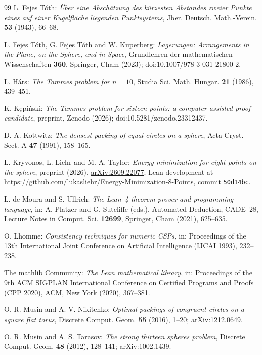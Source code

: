 \documentclass[12pt]{amsart}
\theoremstyle{definition}
\theoremstyle{plain}
\theoremstyle{definition}
\begin{document}
\begin{thebibliography}{99}
 L. Fejes T\'oth: \emph{\"Uber eine Absch\"atzung des k\"urzesten Abstandes zweier Punkte eines auf einer Kugelfl\"ache liegenden Punktsystems}, Jber. Deutsch. Math.-Verein. \textbf{53} (1943), 66--68. %

 L. Fejes T\'oth, G. Fejes T\'oth and W. Kuperberg: \emph{Lagerungen: Arrangements in the Plane, on the Sphere, and in Space}, Grundlehren der mathematischen Wissenschaften \textbf{360}, Springer, Cham (2023); doi:10.1007/978-3-031-21800-2. %

 L. H\'ars: \emph{The Tammes problem for $n=10$}, Studia Sci. Math. Hungar. \textbf{21} (1986), 439--451.

 K. K\k{e}pi\'nski: \emph{The Tammes problem for sixteen points: a computer-assisted proof candidate}, preprint, Zenodo (2026); doi:10.5281/zenodo.23312437.

 D. A. Kottwitz: \emph{The densest packing of equal circles on a sphere}, Acta Cryst. Sect. A \textbf{47} (1991), 158--165.

 L. Kryvonos, L. Liehr and M. A. Taylor: \emph{Energy minimization for eight points on the sphere}, preprint (2026), \href{https://arxiv.org/abs/2609.22077}{arXiv:2609.22077}; Lean development at \url{https://github.com/lukasliehr/Energy-Minimization-8-Points}, commit \texttt{50d14bc}.

 L. de Moura and S. Ullrich: \emph{The Lean~4 theorem prover and programming language}, in: A. Platzer and G. Sutcliffe (eds.), Automated Deduction, CADE~28, Lecture Notes in Comput. Sci. \textbf{12699}, Springer, Cham (2021), 625--635.

 O. Lhomme: \emph{Consistency techniques for numeric CSPs}, in: Proceedings of the 13th International Joint Conference on Artificial Intelligence (IJCAI 1993), 232--238.

 The mathlib Community: \emph{The Lean mathematical library}, in: Proceedings of the 9th ACM SIGPLAN International Conference on Certified Programs and Proofs (CPP 2020), ACM, New York (2020), 367--381.

 O. R. Musin and A. V. Nikitenko: \emph{Optimal packings of congruent circles on a square flat torus}, Discrete Comput. Geom. \textbf{55} (2016), 1--20; arXiv:1212.0649.

 O. R. Musin and A. S. Tarasov: \emph{The strong thirteen spheres problem}, Discrete Comput. Geom. \textbf{48} (2012), 128--141; arXiv:1002.1439.


\end{thebibliography}
\end{document}
